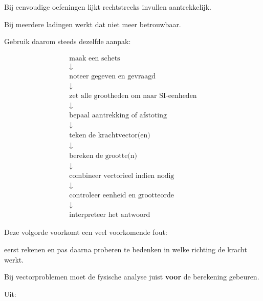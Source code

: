\documentclass{ximera}
\begin{document}


Bij eenvoudige oefeningen lijkt rechtstreeks invullen aantrekkelijk.

Bij meerdere ladingen werkt dat niet meer betrouwbaar.

Gebruik daarom steeds dezelfde aanpak:

\[
\boxed{
\begin{array}{c}
\text{maak een schets}
\\
\downarrow
\\
\text{noteer gegeven en gevraagd}
\\
\downarrow
\\
\text{zet alle grootheden om naar SI-eenheden}
\\
\downarrow
\\
\text{bepaal aantrekking of afstoting}
\\
\downarrow
\\
\text{teken de krachtvector(en)}
\\
\downarrow
\\
\text{bereken de grootte(n)}
\\
\downarrow
\\
\text{combineer vectorieel indien nodig}
\\
\downarrow
\\
\text{controleer eenheid en grootteorde}
\\
\downarrow
\\
\text{interpreteer het antwoord}
\end{array}
}
\]


Deze volgorde voorkomt een veel voorkomende fout:

\begin{center}
eerst rekenen en pas daarna proberen te bedenken in welke richting de
kracht werkt.
\end{center}


Bij vectorproblemen moet de fysische analyse juist \textbf{voor} de
berekening gebeuren.




Uit:
\end{document}
